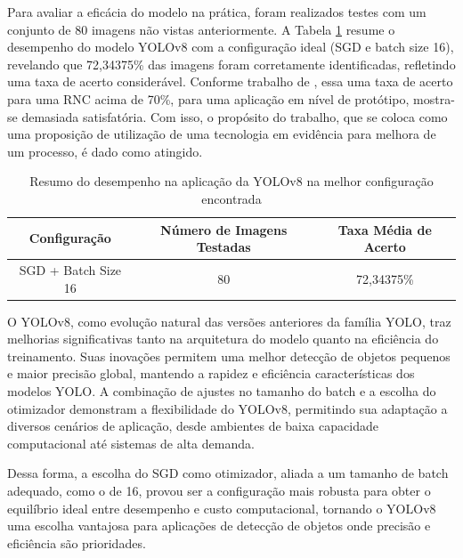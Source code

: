 Para avaliar a eficácia do modelo na prática, foram realizados testes com um conjunto de 80 imagens não vistas anteriormente. A Tabela \ref{tab:yolov8-eval} resume o desempenho do modelo YOLOv8 com a configuração ideal (SGD e batch size 16), revelando que 72,34375\% das imagens foram corretamente identificadas, refletindo uma taxa de acerto considerável. Conforme trabalho de \cite{barbado2022aplicaccao}, essa uma taxa de acerto para uma RNC acima de 70\%, para uma aplicação em nível de protótipo, mostra-se demasiada satisfatória. Com isso, o propósito do trabalho, que se coloca como uma proposição de utilização de uma tecnologia em evidência para melhora de um processo, é dado como atingido. 

\begin{table}[!hbt]
    \centering
    \begin{tabular}{|c|c|c|}
        \hline
        \textbf{Configuração} & \textbf{Número de Imagens Testadas} & \textbf{Taxa Média de Acerto} \\ \hline
        SGD + Batch Size 16 & 80 & 72,34375\% \\ \hline
    \end{tabular}
    \caption{Resumo do desempenho na aplicação da YOLOv8 na melhor configuração encontrada}
    \label{tab:yolov8-eval}
\end{table}

O YOLOv8, como evolução natural das versões anteriores da família YOLO, traz melhorias significativas tanto na arquitetura do modelo quanto na eficiência do treinamento. Suas inovações permitem uma melhor detecção de objetos pequenos e maior precisão global, mantendo a rapidez e eficiência características dos modelos YOLO. A combinação de ajustes no tamanho do batch e a escolha do otimizador demonstram a flexibilidade do YOLOv8, permitindo sua adaptação a diversos cenários de aplicação, desde ambientes de baixa capacidade computacional até sistemas de alta demanda.

Dessa forma, a escolha do SGD como otimizador, aliada a um tamanho de batch adequado, como o de 16, provou ser a configuração mais robusta para obter o equilíbrio ideal entre desempenho e custo computacional, tornando o YOLOv8 uma escolha vantajosa para aplicações de detecção de objetos onde precisão e eficiência são prioridades.








